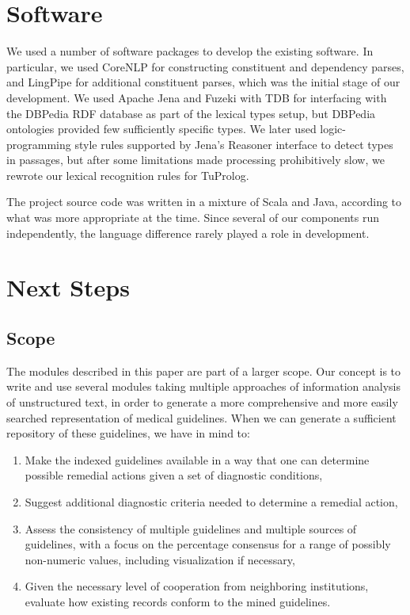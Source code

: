 \documentclass[12pt,letterpaper]{article}
\begin{document}
\section{Software}

We used a number of software packages to develop the existing software. In particular, we used CoreNLP \cite{manning-EtAl:2014:P14-5} for constructing constituent and dependency parses, and LingPipe for additional constituent parses, which was the initial stage of our development.
We used Apache Jena and Fuzeki with TDB for interfacing with the DBPedia RDF database as part of the lexical types setup, but DBPedia ontologies provided few sufficiently specific types. We later used logic-programming style rules supported by Jena's Reasoner interface to detect types in passages, but after some limitations made processing prohibitively slow, we rewrote our lexical recognition rules for TuProlog. 

The project source code was written in a mixture of Scala and Java, according to what was more appropriate at the time. Since several of our components run independently, the language difference rarely played a role in development.

\section{Next Steps}
\subsection*{Scope}

The modules described in this paper are part of a larger scope. Our concept is to write and use several modules taking multiple approaches of information analysis of unstructured text, in order  to generate a more comprehensive and more easily searched representation of medical guidelines. When we can generate a sufficient repository of these guidelines, we have in mind to:

\begin{enumerate}
\item Make the indexed guidelines available in a way that one can determine possible remedial actions given a set of diagnostic conditions,
\item Suggest additional diagnostic criteria needed to determine a remedial action,
\item Assess the consistency of multiple guidelines and multiple sources of guidelines, with a focus on the percentage consensus for a range of possibly non-numeric values, including visualization if necessary,
\item Given the necessary level of cooperation from neighboring institutions, evaluate how existing records conform to the mined guidelines.
\end{enumerate}
\end{document}
